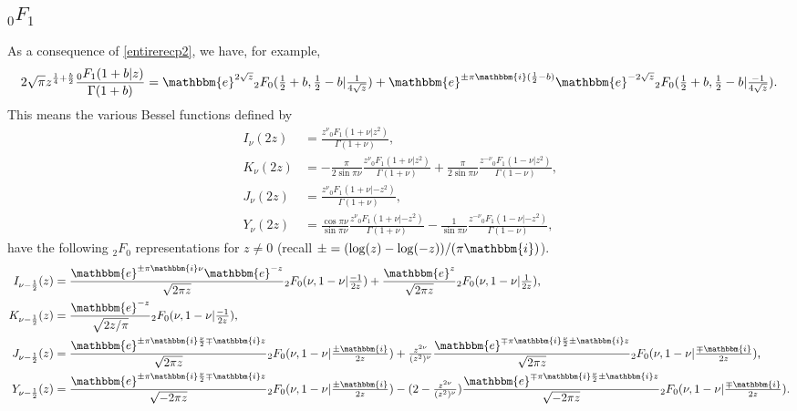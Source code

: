 \documentclass[12pt]{article}
\newcommand{\ee}[0] {\mathbbm{e}}
\newcommand{\ii}[0] {\mathbbm{i}}
\numberwithin{equation}{section}
\begin{document}
\subsection{${}_0 F_1$}
As a consequence of \eqref{entirerecp2}, we have, for example,
\begin{equation*}
2 \sqrt{\pi} z^{\frac{1}{4}+\frac{b}{2}}\frac{{}_0 F_1(1+b|z)}{\Gamma(1+b)} = \ee^{2\sqrt{z}}  {}_2 F_0(\tfrac{1}{2}+b,\tfrac{1}{2}-b|\tfrac{1}{4\sqrt{z}}) + \ee^{\pm \pi \ii(\frac{1}{2}-b)}\ee^{-2\sqrt{z}}  {}_2 F_0(\tfrac{1}{2}+b,\tfrac{1}{2}-b|\tfrac{-1}{4\sqrt{z}})\text{.}
\end{equation*}
This means the various Bessel functions defined by
\begin{align*}
I_{\nu}(2z) &= \frac{z^{\nu} {}_0 F_1(1+\nu| z^2)}{\Gamma(1+\nu)}\text{,}\\
K_{\nu}(2z) &= -\frac{\pi}{2\sin \pi \nu} \frac{z^{\nu} {}_0 F_1(1+\nu| z^2)}{\Gamma(1+\nu)} + \frac{\pi}{2\sin \pi \nu} \frac{z^{-\nu} {}_0 F_1(1-\nu| z^2)}{\Gamma(1-\nu)} \text{,}\\
J_{\nu}(2z) &= \frac{z^{\nu} {}_0 F_1(1+\nu| -z^2)}{\Gamma(1+\nu)}\text{,}\\
Y_{\nu}(2z) &= \frac{\cos \pi \nu}{\sin \pi \nu} \frac{z^{\nu} {}_0 F_1(1+\nu| -z^2)}{\Gamma(1+\nu)} - \frac{1}{\sin \pi \nu} \frac{z^{-\nu} {}_0 F_1(1-\nu| -z^2)}{\Gamma(1-\nu)}\text{,}
\end{align*}
have the following ${}_2F_0$ representations for $z \ne 0$ (recall $\pm = (\log (z) - \log (-z))/(\pi \ii)$).
\begin{align*}
I_{\nu-\frac{1}{2}}(z) &= \frac{\ee^{\pm \pi \ii \nu}\ee^{-z}}{ \sqrt{2\pi z}} {}_2 F_0(\nu,1-\nu|\tfrac{-1}{2z}) + \frac{\ee^{z}}{ \sqrt{2\pi z}} {}_2 F_0(\nu,1-\nu|\tfrac{1}{2z})\text{,}\\
K_{\nu-\frac{1}{2}}(z) &= \frac{\ee^{-z}}{ \sqrt{2z/\pi}} {}_2 F_0(\nu,1-\nu|\tfrac{-1}{2z})\text{,}\\
J_{\nu-\frac{1}{2}}(z) &= \frac{\ee^{\pm \pi \ii \frac{\nu}{2} \mp \ii z}}{\sqrt{2\pi z}} {}_2 F_0(\nu,1-\nu|\tfrac{\pm \ii}{2 z}) + \tfrac{z^{2\nu}}{(z^2)^{\nu}} \frac{\ee^{\mp \pi \ii \frac{\nu}{2} \pm \ii z}}{\sqrt{2\pi z}} {}_2 F_0(\nu,1-\nu|\tfrac{\mp \ii}{2 z})\text{,}\\
Y_{\nu-\frac{1}{2}}(z) &= \frac{\ee^{\pm \pi \ii \frac{\nu}{2} \mp \ii z}}{\sqrt{-2\pi z}} {}_2 F_0(\nu,1-\nu|\tfrac{\pm \ii}{2 z}) - (2-\tfrac{z^{2\nu}}{(z^2)^{\nu}}) \frac{\ee^{\mp \pi \ii \frac{\nu}{2} \pm \ii z}}{\sqrt{-2\pi z}} {}_2 F_0(\nu,1-\nu|\tfrac{\mp \ii}{2 z})\text{.}
\end{align*}
\end{document}

